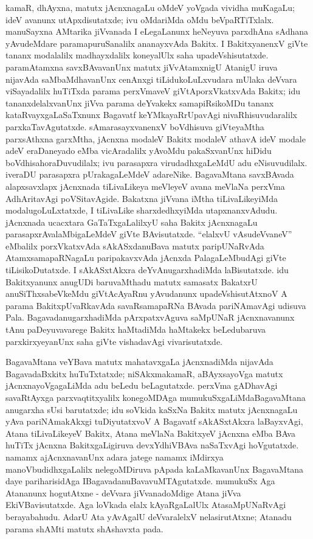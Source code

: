 kamaR, dhAyxna, matutx jAcnxnagaLu oMdeV yoVgada vividha muKagaLu; ideV avanunx utApxdisutatxde; ivu oMdariMda oMdu beVpaRTiTxlalx. manuSayxna AMtarika jiVvanada I eLegaLanunx heNeyuva parxdhAna sAdhana yAvudeMdare paramapuruSanalilx ananayxvAda Bakitx. I BakitxyanenxV giVte tananx modalalilx madhayxdalilx koneyalUlx saha upadeVshisutatxde. paramAtamxna savxBAvavanUnx matutx jiVvAtamxnigU AtanigU iruva nijavAda saMbaMdhavanUnx cenAnxgi tiLidukoLuLxvudara mUlaka deVvara viSayadalilx huTiTxda parama perxVmaveV giVtAporxVkatxvAda Bakitx; idu tananxdelalxvanUnx jiVva parama deYvakekx samapiRsikoMDu tananx kataRvayxgaLaSaTxnunx Bagavatf keYMkayaRrUpavAgi nivaRhisuvudaralilx parxkaTavAgutatxde. sAmarasayxvanenxV boVdhisuva giVteyaMtha parxsAthxna garxMtha, jAcnxna modaleV Bakitx modaleV athavA ideV modale adeV eraDaneyado eMba vicAradalilx yAvoMdu pakaSxvanUnx hiDidu boVdhisahoraDuvudilalx; ivu parasapxra virudadhxgaLeMdU adu eNisuvudilalx. iveraDU parasapxra pUrakagaLeMdeV adareNike. BagavaMtana savxBAvada alapxsavxlapx jAcnxnada tiLivaLikeya meVleyeV avana meVlaNa perxVma AdhAritavAgi poVSitavAgide. Bakatxna jiVvana iMtha tiLivaLikeyiMda modalugoLuLxtatxde, I tiLivaLike sharxdedhxyiMda utapxnanxvAdudu. jAcnxnada ucacxtara GaTaTxgaLalilxyU saha Bakitx jAcnxnagaLu parasapxrAvalaMbigaLeMdeV giVte BAvisutatxde. ``elalxvU vAsudeVvaneV'' eMbalilx porxVkatxvAda sAkASxdanuBava matutx paripUNaRvAda AtamxsamapaRNagaLu paripakavxvAda jAcnxda PalagaLeMbudAgi giVte tiLisikoDutatxde. I sAkASxtAkxra deYvAnugarxhadiMda laBisutatxde. idu Bakitxyanunx anugUDi baruvaMthadu matutx samasatx BakatxrU anuSiThxsabeVkeMdu giVtAcAyaRnu yAvudanunx upadeVshisutAtxnoV A parama BakitxpUvaRkavAda savaRsamapaRNa BAvada pariNAmavAgi udisuva Pala. BagavadanugarxhadiMda pArxpatxvAguva saMpUNaR jAcnxnavanunx tAnu paDeyuvavarege Bakitx haMtadiMda haMtakekx beLedubaruva parxkirxyeyanUnx saha giVte vishadavAgi vivarisutatxde.

BagavaMtana veYBava matutx mahatavxgaLa jAcnxnadiMda nijavAda BagavadaBxkitx huTuTxtatxde; niSAkxmakamaR, aBAyxsayoVga matutx jAcnxnayoVgagaLiMda adu beLedu beLagutatxde. perxVma gADhavAgi savaRtAyxga parxvaqtitxyalilx konegoMDAga mumukuSxgaLiMda\break BagavaMtana anugarxha sUsi barutatxde; idu soVkida kaSxNa Bakitx matutx jAcnxnagaLu yAva pariNAmakAkxgi tuDiyutatxvoV A Bagavatf sAkASxtAkxra laBayxvAgi, Atana tiLivaLikeyeV Bakitx, Atana meVlaNa BakitxyeV jAcnxna eMba BAva huTiTx jAcnxna BakitxgaLigiruva devxYdhiVBAva naSaTxvAgi hoVgutatxde. namamx ajAcnxnavanUnx adara jatege namamx iMdirxya manoVbudidhx\-gaLalilx nelegoMDiruva pApada kaLaMkavanUnx BagavaMtana daye pariharisidAga I\break BagavadanuBavavuMTAgutatxde. mumukuSx Aga Atananunx hogutAtxne - deVvara jiVvana\-doMdige Atana jiVva EkiVBavisutatxde. Aga loVkada elalx kAyaRgaLalUlx Ata\break saMpUNaRvAgi berayabahudu. AdarU Ata yAvAgalU deVvaralelxV nelasirutAtxne; Atanadu parama shAMti matutx shAshavxta pada.

